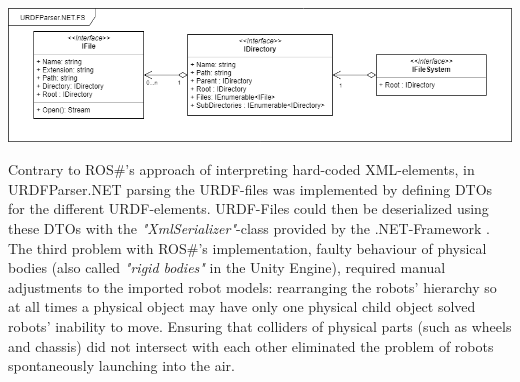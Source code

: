 \begin{center}
\noindent\includegraphics[width=14cm]{tex/img/ch05/URDFParser_FileSystemInterfaces03.png}
\label{fig:filesystem}
\end{center}
Contrary to ROS\#'s approach of interpreting hard-coded XML-elements, in URDFParser.NET parsing the URDF-files was implemented by defining \acp{DTO} for the different URDF-elements. URDF-Files could then be deserialized using these \acsp{DTO} with the \textit{"XmlSerializer"}-class provided by the .NET-Framework \cite{XmlSerializer}.\\
The third problem with ROS\#'s implementation, faulty behaviour of physical bodies (also called \textit{"rigid bodies"} in the Unity Engine), required manual adjustments to the imported robot models: rearranging the robots' hierarchy so at all times a physical object may have only one physical child object solved robots' inability to move. Ensuring that colliders of physical parts (such as wheels and chassis) did not intersect with each other eliminated the problem of robots spontaneously launching into the air. 

